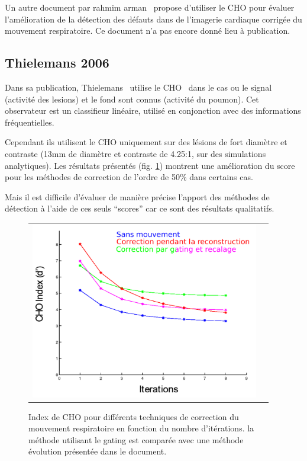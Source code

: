 Un autre document par rahmim arman~\cite{rahmim4d} propose d'utiliser le CHO pour évaluer l'amélioration de la détection des défauts dans de l'imagerie cardiaque corrigée du mouvement respiratoire. Ce document n'a pas encore donné lieu à publication.

\subsection{Thielemans 2006}

Dans sa publication, Thielemans~\cite{Thielemans2006Lesion} utilise le CHO~\cite{barrett1993model} dans le cas ou le signal (activité des lesions) et le fond sont connus (activité du poumon). Cet observateur est un classifieur linéaire, utilisé en conjonction avec des informations fréquentielles. 

Cependant ils utilisent le CHO uniquement sur des lésions de fort diamètre et contraste (13mm de diamètre et contraste de 4.25:1, sur des simulations analytiques). Les résultats présentés (fig. \ref{fig:apportCHO}) montrent une amélioration du score pour les méthodes de correction de l'ordre de 50\% dans certains cas. 

Mais il est difficile d'évaluer de manière précise l'apport des méthodes de détection à l'aide de ces seuls ``scores'' car ce sont des résultats qualitatifs. 

\begin{figure}[h!]
	\begin{center}
		\begin{tabular}{c c}
			\includegraphics[width=10cm]{images/apportCHO}
		\end{tabular}
	\end{center}
	\caption{Index de CHO pour différents techniques de correction du mouvement respiratoire en fonction du nombre d'itérations. la méthode utilisant le gating est comparée avec une méthode évolution présentée dans le document.} 
	\label{fig:apportCHO}
\end{figure}


